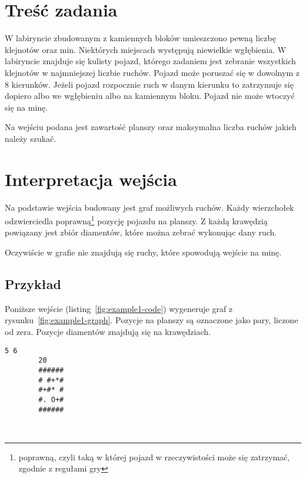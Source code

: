 \section{Treść zadania}

W labiryncie zbudowanym z kamiennych bloków umieszczono pewną liczbę klejnotów
oraz min.
Niektórych miejscach występują niewielkie wgłębienia.
W labiryncie znajduje się kulisty pojazd, którego zadaniem jest zebranie
wszystkich klejnotów w najmniejszej liczbie ruchów.
Pojazd może poruszać się w dowolnym z 8 kierunków.
Jeżeli pojazd rozpocznie ruch w danym kierunku to zatrzymuje się dopiero
albo we wgłębieniu albo na kamiennym bloku.
Pojazd nie może wtoczyć się na minę.

Na wejściu podana jest zawartość planszy oraz maksymalna liczba ruchów jakich
należy szukać.

\section{Interpretacja wejścia}

Na podstawie wejścia budowany jest graf możliwych ruchów.
Każdy wierzchołek odzwierciedla poprawną\footnote{poprawną, czyli taką
w której pojazd w rzeczywistości może się zatrzymać, zgodnie z regułami gry}
pozycję pojazdu na planszy.
Z każdą krawędzią powiązany jest zbiór diamentów, które można zebrać wykonując
dany ruch.

Oczywiście w grafie nie znajdują się ruchy, które spowodują wejście na minę.

\subsection*{Przykład}

Poniższe wejście (listing~\ref{fig:example1-code}) wygeneruje graf
z rysunku~\ref{fig:example1-graph}.
Pozycje na planszy są oznaczone jako pary, liczone od zera.
Pozycje diamentów znajdują się na krawędziach.

\vspace{1cm}

\begin{minipage}{0.5\textwidth}
    \centering
    \begin{lstlisting}[gobble=8,xleftmargin=.4\textwidth]
        5 6
        20
        ######
        # #+*#
        #+#* #
        #. O+#
        ######
    \end{lstlisting}
    \label{fig:example1-code}
\end{minipage}
~
\begin{minipage}{0.5\textwidth}
    \centering
    
    \label{fig:example1-graph}
\end{minipage}

